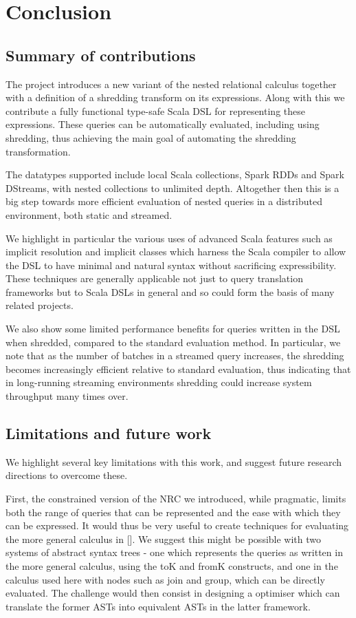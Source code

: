 \chapter{Conclusion} \label{conclusion}

\section{Summary of contributions}

The project introduces a new variant of the nested relational calculus together with a definition of a shredding transform on its expressions. Along with this we contribute a fully functional type-safe Scala DSL for representing these expressions. These queries can be automatically evaluated, including using shredding, thus achieving the main goal of automating the shredding transformation.

The datatypes supported include local Scala collections, Spark RDDs and Spark DStreams, with nested collections to unlimited depth. Altogether then this is a big step towards more efficient evaluation of nested queries in a distributed environment, both static and streamed.

We highlight in particular the various uses of advanced Scala features such as implicit resolution and implicit classes which harness the Scala compiler to allow the DSL to have minimal and natural syntax without sacrificing expressibility. These techniques are generally applicable not just to query translation frameworks but to Scala DSLs in general and so could form the basis of many related projects.

We also show some limited performance benefits for queries written in the DSL when shredded, compared to the standard evaluation method. In particular, we note that as the number of batches in a streamed query increases, the shredding becomes increasingly efficient relative to standard evaluation, thus indicating that in long-running streaming environments shredding could increase system throughput many times over.

\section{Limitations and future work}

We highlight several key limitations with this work, and suggest future research directions to overcome these.

First, the constrained version of the NRC we introduced, while pragmatic, limits both the range of queries that can be represented and the ease with which they can be expressed.  It would thus be very useful to create techniques for evaluating the more general calculus in []. We suggest this might be possible with two systems of abstract syntax trees - one which represents the queries as written in the more general calculus, using the toK and fromK constructs, and one in the calculus used here with nodes such as join and group, which can be directly evaluated. The challenge would then consist in designing a optimiser which can translate the former ASTs into equivalent ASTs in the latter framework.

